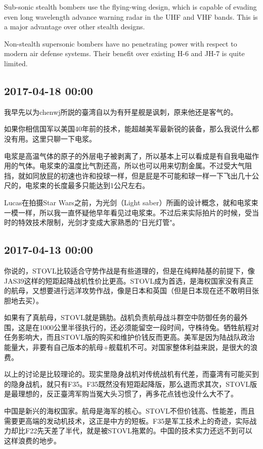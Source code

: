 \documentclass[twocolumn]{ctexart}
\begin{document}
Sub-sonic stealth bombers use the flying-wing design, which is capable of evading even long wavelength advance warning radar in the UHF and VHF bands. This is a major advantage over other stealth designs.

Non-stealth supersonic bombers have no penetrating power with respect to modern air defense systems. Their benefit over existing H-6 and JH-7 is quite limited.\subsection*{2017-04-18 00:00}
我早先以为chenwj所説的臺湾自以为有歼星舰是讽刺，原来他还是客气的。

如果你相信国军以美国40年前的技术，能超越美军最新锐的装备，那么我说什么都没有用。这里只聊一下电浆。

电浆是高温气体的原子的外层电子被剥离了，所以基本上可以看成是有自我电磁作用的气体。电浆束的温度比气割还高，所以也可以用来切割金属。不过受大气阻挡，就如同放屁的初速也许和投球一样，但是屁是不可能和球一样一下飞出几十公尺的，电浆束的长度最多只能达到1公尺左右。

Lucas在拍摄Star Wars之前，为光剑（Light saber）所画的设计概念，就和电浆束一模一样，所以我一直怀疑他早年看见过电浆束。不过后来实际拍片的时候，受当时的特效技术限制，光剑才变成大家熟悉的"日光灯管"。\subsection*{2017-04-13 00:00}
你说的，STOVL比较适合守势作战是有些道理的，但是在纯粹陆基的前提下，像JAS39这样的短距起降战机性价比更高。STOVL成为首选，是海权国家没有真正的航母，又想要进行远洋攻势作战，像是日本和英国（但是日本现在还不敢明目张胆地去买）。

如果有了真航母，STOVL就是鷄肋。战机负责航母战斗群空中防御任务的最外围，这是在1000公里半径执行的，还必须能留空一段时间，守株待兔。牺牲航程对任务影响大，而且STOVL版的购买和维护价钱反而更高。美军是因为陆战队政治能量大，非要有自己版本的航母+舰载机不可。对国家整体利益来説，是很大的浪费。

以上的讨论是比较理论的。现实里隐身战机对传统战机有代差，而臺湾有可能买到的隐身战机，就只有F35。F35既然没有短距起降版，那么退而求其次，STOVL版是最理想的，反正臺湾军购当冤大头习惯了，再多花点钱也没什么大不了。

中国是新兴的海权国家。航母是海军的核心。STOVL不但价钱高、性能差，而且需要更高端的发动机技术，这正是中方的短板。F35是军工技术上的奇迹，实际战力却比F22先天差了半代，就是被STOVL拖累的。中国的技术实力还远不到可以这样浪费的地步。
\end{document}
